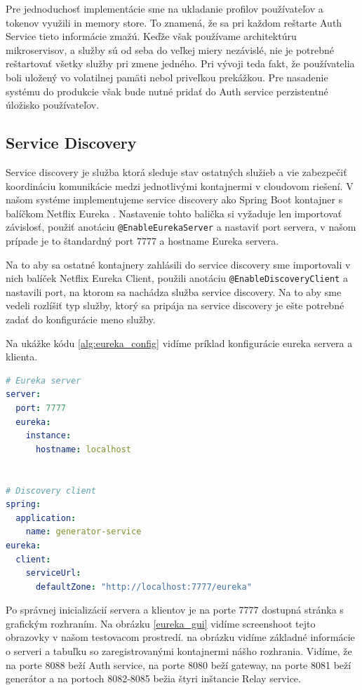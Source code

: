 Pre jednoduchosť implementácie sme na ukladanie profilov používateľov a tokenov využili in memory store. To znamená, že sa pri každom reštarte Auth Service tieto informácie zmažú. Keďže však používame architektúru mikroservisov, a služby sú od seba do veľkej miery nezávislé, nie je potrebné reštartovať všetky služby pri zmene jedného. Pri vývoji teda fakt, že používatelia boli uložený vo volatilnej pamäti nebol priveľkou prekážkou. Pre nasadenie systému do produkcie však bude nutné pridať do Auth service perzistentné úložisko používateľov.


\subsection{Service Discovery}
Service discovery je služba ktorá sleduje stav ostatných služieb a vie zabezpečiť koordináciu komunikácie medzi jednotlivými kontajnermi v cloudovom riešení. V našom systéme implementujeme service discovery ako Spring Boot kontajner s balíčkom Netflix Eureka \cite{eureka}. Nastavenie tohto balička si vyžaduje len importovať závislosť, použiť anotáciu \texttt{@EnableEurekaServer} a nastaviť port servera, v našom prípade je to štandardný port 7777 a hostname Eureka servera.

Na to aby sa ostatné kontajnery zahlásili do service discovery sme importovali v nich balíček Netflix Eureka Client, použili anotáciu \texttt{@EnableDiscoveryClient} a nastavili port, na ktorom sa nachádza služba service discovery. Na to aby sme vedeli rozlíšiť typ služby, ktorý sa pripája na service discovery je ešte potrebné zadať do konfigurácie meno služby.

Na ukážke kódu \ref{alg:eureka_config} vidíme príklad konfigurácie eureka servera a klienta.

\begin{lstlisting}[float, caption={Konfigurácia Eureka servera a klienta},label={alg:eureka_config},language=yaml]
# Eureka server
server:
  port: 7777
  eureka:
	instance:
	  hostname: localhost
			

# Discovery client	
spring:
  application:
	name: generator-service
eureka:
  client:
	serviceUrl:
	  defaultZone: "http://localhost:7777/eureka"
\end{lstlisting}

Po správnej inicializácií servera a klientov je na porte 7777 dostupná stránka s grafickým rozhraním. Na obrázku \ref{eureka_gui} vidíme screenshoot tejto obrazovky v našom testovacom prostredí. na obrázku vidíme základné informácie o serveri a tabuľku so zaregistrovanými kontajnermi nášho rozhrania. Vidíme, že na porte 8088 beží Auth service, na porte 8080 beží gateway, na porte 8081 beží generátor a na portoch 8082-8085 bežia štyri inštancie Relay service.

